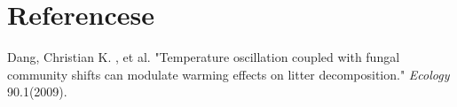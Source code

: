 \section{Referencese}
\begin{thebibliography}{99}

    Dang, Christian K. , et al. "Temperature oscillation coupled with fungal community shifts can modulate warming effects on litter decomposition." \emph{Ecology} 90.1(2009).
\end{thebibliography}